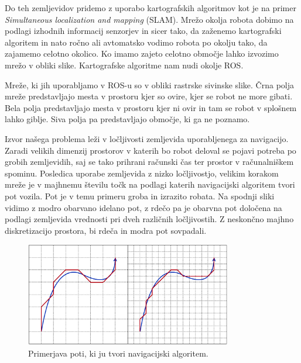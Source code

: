 \documentclass[10pt,a4paper]{article}
\begin{document}
Do teh zemljevidov pridemo z uporabo kartografskih algoritmov kot je na primer \textit{Simultaneous localization and mapping} (SLAM). Mrežo okolja robota dobimo na podlagi izhodnih informacij senzorjev in sicer tako, da zaženemo kartografski algoritem in nato ročno ali avtomatsko vodimo robota po okolju tako, da zajamemo celotno okolico. Ko imamo zajeto celotno območje lahko izvozimo mrežo v obliki slike. Kartografske algoritme nam nudi okolje ROS. 

Mreže, ki jih uporabljamo v ROS-u so v obliki rastrske sivinske slike. Črna polja mreže predstavljajo mesta v prostoru kjer so ovire, kjer se robot ne more gibati. Bela polja predstavljajo mesta v prostoru kjer ni ovir in tam se robot v splošnem lahko giblje. Siva polja pa predstavljajo območje, ki ga ne poznamo.

Izvor našega problema leži v ločljivosti zemljevida uporabljenega za navigacijo. Zaradi velikih dimenzij prostorov v katerih bo robot deloval se pojavi potreba po grobih zemljevidih, saj se tako prihrani računski čas ter prostor v računalniškem spominu. Posledica uporabe zemljevida z nizko ločljivostjo, velikim korakom mreže je v majhnemu številu točk na podlagi katerih navigacijski algoritem tvori pot vozila. Pot je v temu primeru groba in izrazito robata. Na spodnji sliki vidimo z modro obarvano idelano pot, z rdečo pa je obarvna pot določena na podlagi zemljevida vrednosti pri dveh različnih ločljivostih. Z neskončno majhno diskretizacijo prostora, bi rdeča in modra pot sovpadali.

\begin{figure}[H]
	\centering
	\includegraphics[width=9cm]{pic/pot.png}
	\caption{Primerjava poti, ki ju tvori navigacijski algoritem.}
	\label{fig:slika}
\end{figure}

\end{document}
